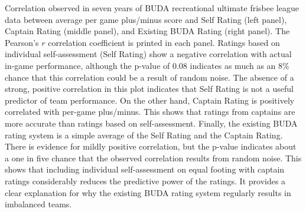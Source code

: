 Correlation observed in seven years of BUDA recreational ultimate frisbee league data between average per game plus/minus score and Self Rating (left panel), Captain Rating (middle panel), and Existing BUDA Rating (right panel).  The Pearson's $r$ correlation coefficient is printed in each panel. Ratings based on individual self-assessment (Self Rating) show a negative correlation with actual in-game performance, although the p-value of 0.08 indicates as much as an 8\% chance that this correlation could be a result of random noise. The absence of a strong, positive correlation in this plot indicates that Self Rating is not a useful predictor of team performance. On the other hand, Captain Rating is positively correlated with per-game plus/minus. This shows that ratings from captains are more accurate than ratings based on self-assessment. Finally, the existing BUDA rating system is a simple average of the Self Rating and the Captain Rating.  There is evidence for mildly positive correlation, but the p-value indicates about a one in five chance that the observed correlation results from random noise.  This shows that including individual self-assessment on equal footing with captain ratings considerably reduces the predictive power of the ratings. It provides a clear explanation for why the existing BUDA rating system regularly results in imbalanced teams.